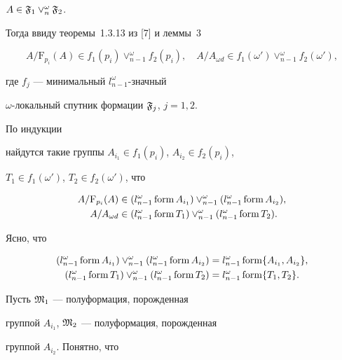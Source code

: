 \begin{pf}
$A\in\frak{F}_1\vee^{\omega}_n\frak{F}_2$.


Тогда ввиду теоремы~1.3.13 из [7] и леммы~3


$$


A/{\mathrm F}_{p_i}(A)\in f_1(p_i)\vee^{\omega}_{n-1}f_2(p_i),


\quad


A/A_{\omega d}\in f_1(\omega')\vee^{\omega}_{n-1}f_2(\omega'),


$$


где $f_j$ --- минимальный $l^{\omega}_{n-1}$-значный


$\omega$-локальный спутник формации $\frak{F}_j$, $j=1, 2$.


По индукции


найдутся такие группы $A_{i_1}\in f_1(p_i)$, $A_{i_2}\in f_2(p_i)$,


$T_1\in f_1(\omega')$, $T_2\in f_2(\omega')$, что


\begin{align*}


A /{\mathrm F}_{p_i}(A)& \in(l^{\omega}_{n-1}


\form A_{i_1})\vee^{\omega}_{n-1}(l^{\omega}_{n-1}\form A_{i_2}), \\


A /A_{\omega d}& \in(l^{\omega}_{n-1}


\form T_1)\vee^{\omega}_{n-1}(l^{\omega}_{n-1}\form T_2).


\end{align*}


Ясно, что


\begin{align*}


(l^{\omega}_{n-1}\form A_{i_1})\vee^{\omega}_{n-1}


(l^{\omega}_{n-1}\form A_{i_2})&=l^{\omega}_{n-1}\form \{A_{i_1}, A_{i_2}\},\\


(l^{\omega}_{n-1}\form T_1)\vee^{\omega}_{n-1}


(l^{\omega}_{n-1}\form T_2)&=l^{\omega}_{n-1}\form \{T_1, T_2\}.


\end{align*}





Пусть $\frak{M}_1$ --- полуформация, порожденная


группой $A_{i_1}$, $\frak{M}_2$ --- полуформация, порожденная


группой $A_{i_2}$. Понятно, что



\end{pf}
